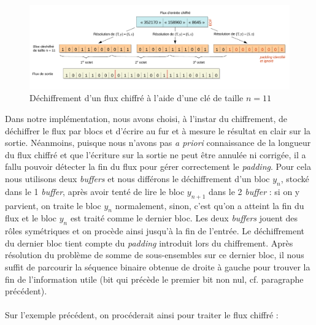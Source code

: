 \documentclass[a4paper,10pt]{article}
\begin{document}
\begin{figure}[!h]
\begin{center}
\hspace*{-0.8in}
  \centering
  \includegraphics[width=20cm]{images/dechiffrement.pdf}
  \caption{Déchiffrement d'un flux chiffré à l'aide d'une clé de taille $n = 11$}
  \label{dechiffrement}
\end{center}
\end{figure}

Dans notre implémentation, nous avons choisi, à l'instar du chiffrement, de déchiffrer le flux par blocs et d'écrire au fur et à mesure le résultat en clair sur la sortie. Néanmoins, puisque nous n'avons pas \textit{a priori} connaissance de la longueur du flux chiffré et que l'écriture sur la sortie ne peut être annulée ni corrigée, il a fallu pouvoir détecter la fin du flux pour gérer correctement le \textit{padding}. Pour cela nous utilisons deux \textit{buffers} et nous différons le déchiffrement d'un bloc $y_n$, stocké dans le 1\ier{} \textit{buffer}, après avoir tenté de lire le bloc $y_{n+1}$ dans le 2 \textit{buffer} : si on y parvient, on traite le bloc $y_n$ normalement, sinon, c'est qu'on a atteint la fin du flux et le bloc $y_n$ est traité comme le dernier bloc. Les deux \textit{buffers} jouent des rôles symétriques et on procède ainsi jusqu'à la fin de l'entrée. Le déchiffrement du dernier bloc tient compte du \textit{padding} introduit lors du chiffrement. Après résolution du problème de somme de sous-ensembles sur ce dernier bloc, il nous suffit de parcourir la séquence binaire obtenue de droite à gauche pour trouver la fin de l'information utile (bit qui précède le premier bit non nul, cf. paragraphe précédent).

\paragraph{} Sur l'exemple précédent, on procéderait ainsi pour traiter le flux chiffré :
\end{document}
